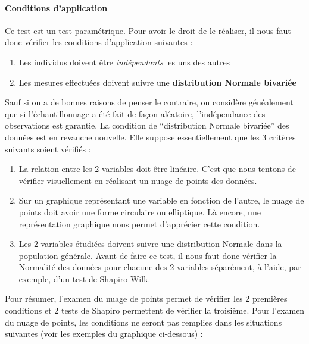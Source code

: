 \documentclass[a4paperpaper,]{article}
\providecommand{\tightlist}{%
  \setlength{\itemsep}{0pt}\setlength{\parskip}{0pt}}
\let\oldparagraph\paragraph
\renewcommand{\paragraph}[1]{\oldparagraph{#1}\mbox{}}
\begin{document}
\hypertarget{conditions-dapplication-3}{%
\paragraph{Conditions d'application}\label{conditions-dapplication-3}}

Ce test est un test paramétrique. Pour avoir le droit de le réaliser, il nous faut donc vérifier les conditions d'application suivantes :

\begin{enumerate}
\def\labelenumi{\arabic{enumi}.}
\tightlist
\item
  Les individus doivent être \emph{indépendants} les uns des autres
\item
  Les mesures effectuées doivent suivre une \textbf{distribution Normale bivariée}
\end{enumerate}

Sauf si on a de bonnes raisons de penser le contraire, on considère généalement que si l'échantillonnage a été fait de façon aléatoire, l'indépendance des observations est garantie. La condition de ``distribution Normale bivariée'' des données est en revanche nouvelle. Elle suppose essentiellement que les 3 critères suivants soient vérifiés :

\begin{enumerate}
\def\labelenumi{\arabic{enumi}.}
\tightlist
\item
  La relation entre les 2 variables doit être linéaire. C'est que nous tentons de vérifier visuellement en réalisant un nuage de points des données.
\item
  Sur un graphique représentant une variable en fonction de l'autre, le nuage de points doit avoir une forme circulaire ou elliptique. Là encore, une représentation graphique nous permet d'apprécier cette condition.
\item
  Les 2 variables étudiées doivent suivre une distribution Normale dans la population générale. Avant de faire ce test, il nous faut donc vérifier la Normalité des données pour chacune des 2 variables séparément, à l'aide, par exemple, d'un test de Shapiro-Wilk.
\end{enumerate}

Pour résumer, l'examen du nuage de points permet de vérifier les 2 premières conditions et 2 tests de Shapiro permettent de vérifier la troisième. Pour l'examen du nuage de points, les conditions ne seront pas remplies dans les situations suivantes (voir les exemples du graphique ci-dessous) :
\end{document}
